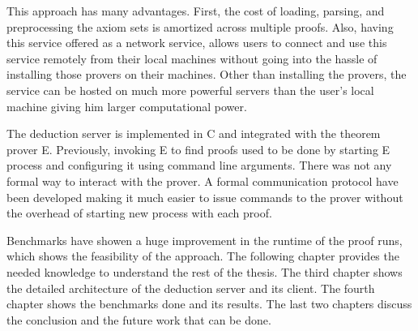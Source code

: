 This approach has many advantages. First, the cost of loading, parsing, and preprocessing the axiom sets is amortized across multiple proofs. Also, having this service offered as a network service, allows users to connect and use this service remotely from their local machines without going into the hassle of installing those provers on their machines. Other than installing the provers, the service can be hosted on much more powerful servers than the user's local machine giving him larger computational power.

The deduction server is implemented in C and integrated with the theorem prover E\cite{Schulz:AICOM-2002,Schulz:LPAR-2013}. Previously, invoking E to find proofs used to be done by starting E process and configuring it using command line arguments. There was not any formal way to interact with the prover. A formal communication protocol have been developed making it much easier to issue commands to the prover without the overhead of starting new process with each proof.

Benchmarks have showen a huge improvement in the runtime of the proof runs, which shows the feasibility of the approach. The following chapter provides the needed knowledge to understand the rest of the thesis. The third chapter shows the detailed architecture of the deduction server and its client. The fourth chapter shows the benchmarks done and its results. The last two chapters discuss the conclusion and the future work that can be done.
